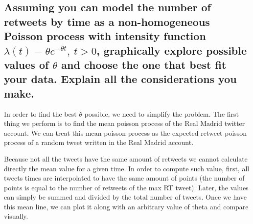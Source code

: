 \subsection{Assuming you can model the number of retweets by time as a non-homogeneous Poisson process with intensity function $ \lambda (t) = \theta e^{-\theta t},\ t>0$, graphically explore possible values of $\theta$ and choose the one that best fit your data. Explain all the considerations you make.}

In order to find the best $\theta$ possible, we need to simplify the problem. 
The first thing we perform is to find the mean poisson process of the Real Madrid twitter account. 
We can treat this mean poisson process as the expected retweet poisson process of a random tweet written in the Real Madrid account.

Because not all the tweets have the same amount of retweets we cannot calculate directly the mean value for a given time. 
In order to compute such value, first, all tweets times are interpolated to have the same amount of points (the number of points is equal to the number of retweets of the max RT tweet). 
Later, the values can simply be summed and divided by the total number of tweets. 
Once we have this mean line, we can plot it along with an arbitrary value of theta and compare visually.


